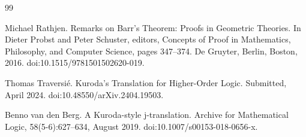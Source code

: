 \documentclass[10pt,a4paper]{article}
\begin{document}
\begin{thebibliography}{99}
\par\noindent    Michael Rathjen.  Remarks on Barr’s Theorem: Proofs in Geometric Theories.  In Dieter Probst and Peter Schuster, editors, Concepts of Proof in Mathematics, Philosophy, and Computer Science, pages 347–374. De Gruyter, Berlin, Boston, 2016.  doi:10.1515/9781501502620-019.  

\par\noindent    Thomas Traversié.  Kuroda’s Translation for Higher-Order Logic.  Submitted, April 2024.  doi:10.48550/arXiv.2404.19503.  

\par\noindent    Benno van den Berg.  A Kuroda-style j-translation.  Archive for Mathematical Logic, 58(5-6):627–634, August 2019.  doi:10.1007/s00153-018-0656-x.  

\end{thebibliography}
\end{document}
